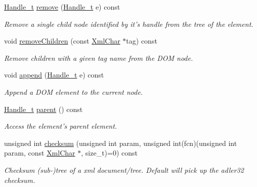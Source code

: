 \begin{DoxyCompactItemize}
\hyperlink{class_d_d4hep_1_1_x_m_l_1_1_handle__t}{Handle\_\-t} \hyperlink{class_d_d4hep_1_1_x_m_l_1_1_handle__t_a2e4294b309fc5a0f6f292f17303585e9}{remove} (\hyperlink{class_d_d4hep_1_1_x_m_l_1_1_handle__t}{Handle\_\-t} e) const 
\begin{DoxyCompactList}\small\item\em Remove a single child node identified by it's handle from the tree of the element. \item\end{DoxyCompactList}\item 
void \hyperlink{class_d_d4hep_1_1_x_m_l_1_1_handle__t_a36ab396dc039bfd2c9c9b11765b98f5c}{removeChildren} (const \hyperlink{namespace_d_d4hep_1_1_x_m_l_a09e5d9cc86ed782f6826dfe0778c1815}{XmlChar} $\ast$tag) const 
\begin{DoxyCompactList}\small\item\em Remove children with a given tag name from the DOM node. \item\end{DoxyCompactList}\item 
void \hyperlink{class_d_d4hep_1_1_x_m_l_1_1_handle__t_a14ec550e05cfc9dfc0e41a52de03763e}{append} (\hyperlink{class_d_d4hep_1_1_x_m_l_1_1_handle__t}{Handle\_\-t} e) const 
\begin{DoxyCompactList}\small\item\em Append a DOM element to the current node. \item\end{DoxyCompactList}\item 
\hyperlink{class_d_d4hep_1_1_x_m_l_1_1_handle__t}{Handle\_\-t} \hyperlink{class_d_d4hep_1_1_x_m_l_1_1_handle__t_a3b6bba67542d2fa93a64e667d6e6ae69}{parent} () const 
\begin{DoxyCompactList}\small\item\em Access the element's parent element. \item\end{DoxyCompactList}\item 
unsigned int \hyperlink{class_d_d4hep_1_1_x_m_l_1_1_handle__t_a46f681b65e7cdbed54b6f088a4e9320e}{checksum} (unsigned int param, unsigned int(fcn)(unsigned int param, const \hyperlink{namespace_d_d4hep_1_1_x_m_l_a09e5d9cc86ed782f6826dfe0778c1815}{XmlChar} $\ast$, size\_\-t)=0) const 
\begin{DoxyCompactList}\small\item\em Checksum (sub-\/)tree of a xml document/tree. Default will pick up the adler32 checksum. \item\end{DoxyCompactList}\item 

\end{DoxyCompactItemize}

